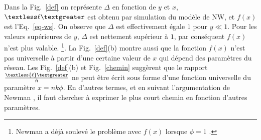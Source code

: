 Dans la Fig.~\ref{def} on représente $\Delta$ en fonction de $y$ et $x$, $\textless \ell \textgreater$ est obtenu par simulation du modèle de NW, et $f(x)$ est l'Eq.~\eqref{eq-ws}. On observe que $\Delta$ est effectivement égale $1$ pour $y\ll1$. Pour les valeurs supérieures de $y$, $\Delta$ est nettement supérieur à $1$, par conséquent $f(x)$ n'est plus valable.  \footnote{Newman a déjà soulevé le problème avec $f(x)$ lorsque $\phi=1$ \cite{Newman-al2000} .}. La Fig.~\ref{def}(b) montre aussi que la fonction $f(x)$ n'est pas universelle à partir d'une certaine valeur de $x$ qui dépend des paramètres du réseau. Les Fig.~\ref{def}(b) et Fig.~\ref{chemin} suggèrent que le rapport $\frac{\textless {\ell} \textgreater}{\hat{n}}$ ne peut être écrit sous forme d'une fonction universelle du paramètre $x=nk\phi$. En d'autres termes, et en suivant l'argumentation de Newman \cite{Newman-al2000}, il faut chercher à exprimer le plus court chemin en fonction d'autres paramètres.
